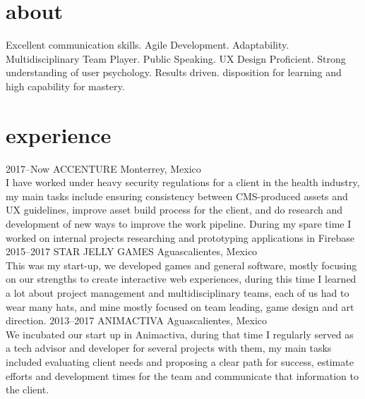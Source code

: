 \documentclass[]{cv-style}          %
\begin{document}

\section{about}
  \vspace{-0.2cm}
Excellent communication skills. Agile Development. Adaptability. Multidisciplinary Team Player. Public Speaking. UX Design Proficient. Strong understanding of user psychology. Results driven. disposition for learning and high capability for mastery.



\section{experience}


\begin{entrylist}
\entry
  {2017--Now}
  {ACCENTURE}
  {Monterrey, Mexico}
  {\\
 I have worked under heavy security regulations for a client in the health industry, my main tasks include ensuring consistency between CMS-produced assets and UX guidelines, improve asset build process for the client, and do research and development of new ways to improve the work pipeline. During my spare time I worked on internal projects researching and prototyping applications in Firebase }
\entry
  {2015--2017}
  {STAR JELLY GAMES}
  {Aguascalientes, Mexico}
  {\\
  This was my start-up, we developed games and general software, mostly focusing on our strengths to create interactive web experiences, during this time I learned a lot about project management and multidisciplinary teams, each of us had to wear many hats, and mine mostly focused on team leading, game design and art direction. }
\entry
  {2013--2017}
  {ANIMACTIVA}
  {Aguascalientes, Mexico}
  {\\
  We incubated our start up in Animactiva, during that time I regularly served as a tech advisor and developer for several projects with them, my main tasks included evaluating client needs and proposing a clear path for success, estimate efforts and development times for the team and communicate that information to the client.
}

\end{entrylist}
\end{document}

